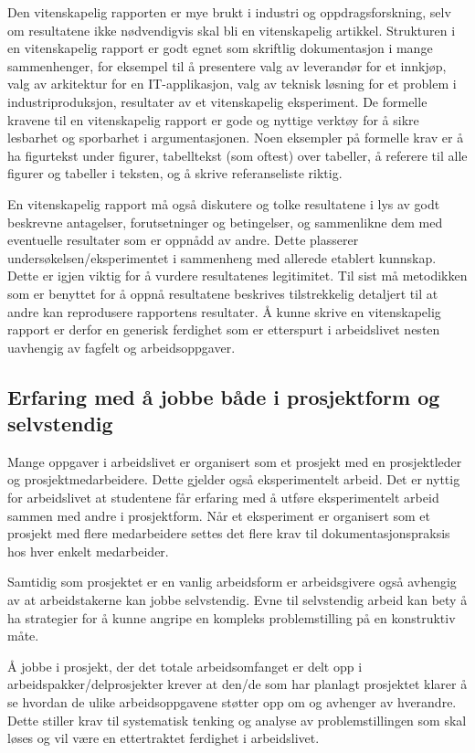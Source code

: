 \documentclass{article}
\begin{document}
Den vitenskapelig rapporten er mye brukt i industri og oppdragsforskning, selv om resultatene ikke nødvendigvis skal bli en vitenskapelig artikkel.
Strukturen i en vitenskapelig rapport er godt egnet som skriftlig dokumentasjon i mange sammenhenger, for eksempel til å presentere valg av leverandør for et innkjøp, valg av arkitektur for en IT-applikasjon, valg av teknisk løsning for et problem i industriproduksjon, resultater av et vitenskapelig eksperiment.
De formelle kravene til en vitenskapelig rapport er gode og nyttige verktøy for å sikre lesbarhet og sporbarhet i argumentasjonen.
Noen eksempler på formelle krav er å ha figurtekst under figurer, tabelltekst (som oftest) over tabeller, å referere til alle figurer og tabeller i teksten, og å skrive referanseliste riktig.

En vitenskapelig rapport må også diskutere og tolke resultatene i lys av godt beskrevne antagelser, forutsetninger og betingelser, og sammenlikne dem med eventuelle resultater som er oppnådd av andre.
Dette plasserer undersøkelsen/eksperimentet i sammenheng med allerede etablert kunnskap.
Dette er igjen viktig for å vurdere resultatenes legitimitet.
Til sist må metodikken som er benyttet for å oppnå resultatene beskrives tilstrekkelig detaljert til at andre kan reprodusere rapportens resultater.
Å kunne skrive en vitenskapelig rapport er derfor en generisk ferdighet som er etterspurt i arbeidslivet nesten uavhengig av fagfelt og arbeidsoppgaver.

\subsection{Erfaring med å jobbe både i prosjektform og selvstendig}
Mange oppgaver i arbeidslivet er organisert som et prosjekt med en prosjektleder og prosjektmedarbeidere.
Dette gjelder også eksperimentelt arbeid.
Det er nyttig for arbeidslivet at studentene får erfaring med å utføre eksperimentelt arbeid sammen med andre i prosjektform.
Når et eksperiment er organisert som et prosjekt med flere medarbeidere settes det flere krav til dokumentasjonspraksis hos hver enkelt medarbeider.

Samtidig som prosjektet er en vanlig arbeidsform er arbeidsgivere også avhengig av at arbeidstakerne kan jobbe selvstendig.
Evne til selvstendig arbeid kan bety å ha strategier for å kunne angripe en kompleks problemstilling på en konstruktiv måte.

Å jobbe i prosjekt, der det totale arbeidsomfanget er delt opp i arbeidspakker/delprosjekter krever at den/de som har planlagt prosjektet klarer å se hvordan de ulike arbeidsoppgavene støtter opp om og avhenger av hverandre.
Dette stiller krav til systematisk tenking og analyse av problemstillingen som skal løses og vil være en ettertraktet ferdighet i arbeidslivet.
\end{document}
